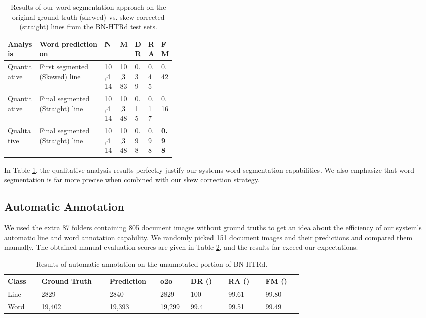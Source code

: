 \documentclass[runningheads]{llncs}
\begin{document}
\begin{table}[h]
\vspace{-4mm}
\centering
\caption{Results of our word segmentation approach on the original ground truth (skewed) vs. skew-corrected (straight) lines from the BN-HTRd test sets.}\label{drishti-tab6}
\begin{tabular}
{|l|l|p{0.09\linewidth}|p{0.09\linewidth}|p{0.07\linewidth}|p{0.07\linewidth}|p{0.07\linewidth}|}
\hline
\textbf{Analysis} & \textbf{Word prediction on} & \textbf{N} & \textbf{M} & \textbf{DR} & \textbf{RA} & \textbf{FM} \\ \hline
Quantitative & First segmented (Skewed) line & 10,414 & 10,383 & 0.39 & 0.45 & 0.42 \\
\hline
Quantitative & Final segmented (Straight) line & 10,414 & 10,348 & 0.15 & 0.17 & 0.16 \\ 
\hline
Qualitative & Final segmented (Straight) line & 10,414 & 10,348 & 0.98 & 0.98 & \textbf{0.98 }\\ 
\hline
\end{tabular}
\vspace{-4mm}
\end{table}

\noindent In Table \ref{drishti-tab6}, the qualitative analysis results perfectly justify our systems word segmentation capabilities. We also emphasize that word segmentation is far more precise when combined with our skew correction strategy.

\subsection{Automatic Annotation}
We used the extra 87 folders containing 805 document images without ground truths to get an idea about the efficiency of our system's automatic line and word annotation capability. We randomly picked 151 document images and their predictions and compared them manually. The obtained manual evaluation scores are given in Table \ref{drishti-tab7}, and the results far exceed our expectations.

\begin{table}[h]
\vspace{-4mm}
\centering
\caption{Results of automatic annotation on the unannotated portion of BN-HTRd.}\label{drishti-tab7}
\vspace{-1mm}
\begin{tabular}{|p{0.1\linewidth}|p{0.20\linewidth}|p{0.15\linewidth}|p{0.09\linewidth}|p{0.11\linewidth}|p{0.11\linewidth}|p{0.11\linewidth}|}
\hline
\textbf{Class} & \textbf{Ground Truth} & \textbf{Prediction} & \textbf{o2o} & \textbf{DR ()} & \textbf{RA ()} & \textbf{FM ()}\\
\hline
Line &	2829 &	2840 &	2829 &	100 &	99.61 &	99.80\\
\hline
Word &	19,402 &	19,393  &	19,299 &	99.4 &	99.51 &	99.49\\
\hline
\end{tabular}
\vspace{-6mm}
\end{table}
\end{document}
